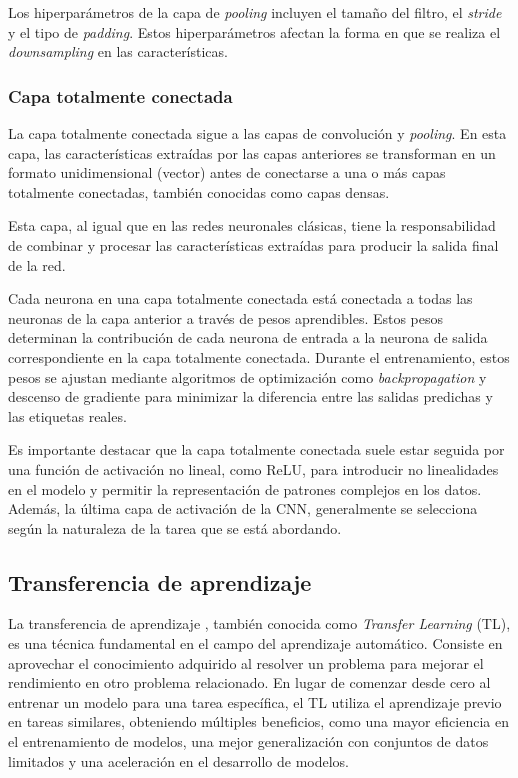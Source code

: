 Los hiperparámetros de la capa de \textit{pooling} incluyen el tamaño del filtro, el \textit{stride} y el tipo de \textit{padding}. Estos hiperparámetros afectan la forma en que se realiza el \textit{downsampling} en las características.

\subsubsection*{Capa totalmente conectada}

La capa totalmente conectada sigue a las capas de convolución y \textit{pooling}. En esta capa, las características extraídas por las capas anteriores se transforman en un formato unidimensional (vector) antes de conectarse a una o más capas totalmente conectadas, también conocidas como capas densas.

Esta capa, al igual que en las redes neuronales clásicas, tiene la responsabilidad de combinar y procesar las características extraídas para producir la salida final de la red.

Cada neurona en una capa totalmente conectada está conectada a todas las neuronas de la capa anterior a través de pesos aprendibles. Estos pesos determinan la contribución de cada neurona de entrada a la neurona de salida correspondiente en la capa totalmente conectada. Durante el entrenamiento, estos pesos se ajustan mediante algoritmos de optimización como \textit{backpropagation} y descenso de gradiente para minimizar la diferencia entre las salidas predichas y las etiquetas reales.

Es importante destacar que la capa totalmente conectada suele estar seguida por una función de activación no lineal, como ReLU, para introducir no linealidades en el modelo y permitir la representación de patrones complejos en los datos. Además, la última capa de activación de la CNN, generalmente se selecciona según la naturaleza de la tarea que se está abordando.

\subsection{Transferencia de aprendizaje}

La transferencia de aprendizaje \cite{49}, también conocida como \textit{Transfer Learning} (TL), es una técnica fundamental en el campo del aprendizaje automático. Consiste en aprovechar el conocimiento adquirido al resolver un problema para mejorar el rendimiento en otro problema relacionado. En lugar de comenzar desde cero al entrenar un modelo para una tarea específica, el TL utiliza el aprendizaje previo en tareas similares, obteniendo múltiples beneficios, como una mayor eficiencia en el entrenamiento de modelos, una mejor generalización con conjuntos de datos limitados y una aceleración en el desarrollo de modelos.


